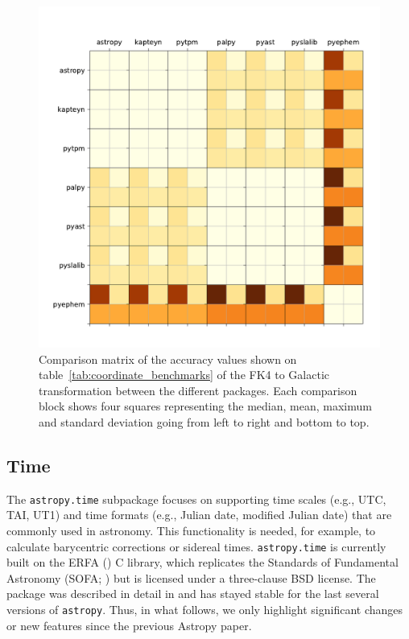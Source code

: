 \documentclass[modern]{aastex61}
\newcommand{\package}[1]{\texttt{#1}\xspace}
\newcommand{\astropy}{Astropy\xspace}
\newcommand{\astropypkg}{\package{astropy}}
\begin{document}
\begin{figure}
  \includegraphics[width=\textwidth]{coordinates-benchmark.pdf}
  \caption{
    Comparison matrix of the accuracy values shown on
    table~\ref{tab:coordinate_benchmarks} of the FK4 to Galactic transformation
    between the different packages. Each comparison block shows four squares
    representing the median, mean, maximum and standard deviation going from
    left to right and bottom to top.
    \label{fig:coordinate_benchmarks}
  }
\end{figure}

\subsection{Time}
\label{sec:time}

The \package{astropy.time} subpackage focuses on supporting time scales (e.g.,
UTC, TAI, UT1) and time formats (e.g., Julian date, modified Julian date) that
are commonly used in astronomy.
This functionality is needed, for example, to calculate barycentric corrections
or sidereal times.
\package{astropy.time} is currently built on the ERFA (\citealt{erfa}) C
library, which replicates the Standards of Fundamental Astronomy (SOFA;
\citealt{sofa}) but is licensed under a three-clause BSD license.
The package was described in detail in  \citet{astropy} and has
stayed stable for the last several versions of \astropypkg.
Thus, in what follows, we only highlight significant changes or new features
since the previous \astropy paper.
\end{document}
